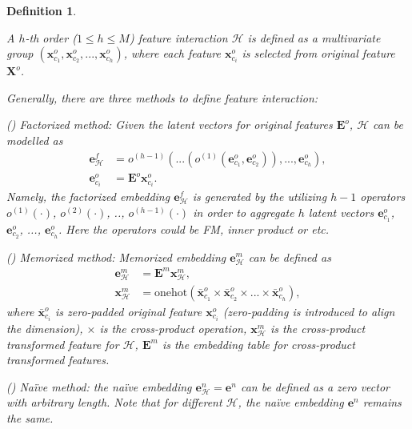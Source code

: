 \documentclass[conference]{IEEEtran}
\newtheorem{myDef}{Definition}
\begin{document}
\begin{myDef}
\label{featuredef}

A $h$-th order ($1 \le h \le M$) feature interaction $\mathcal{H}$ is defined as a multivariate group $(\mathbf{x}^{o}_{c_1}, \mathbf{x}^{o}_{c_2}, ..., \mathbf{x}^{o}_{c_h})$, where each feature $\mathbf{x}^{o}_{c_i}$ is selected from original feature $\mathbf{X}^{o}$. 

Generally, there are three methods to define feature interaction: 

() \emph{Factorized} method: Given the latent vectors for original features $\mathbf{E}^{o}$, $\mathcal{H}$ can be modelled as\cite{AutoPI}
\begin{equation}
\begin{split}
    \mathbf{e}^{f}_{\mathcal{H}} &= o^{(h-1)}(... ( o^{(1)}(\mathbf{e}^{o}_{c_1}, \mathbf{e}^{o}_{c_2})), ... , \mathbf{e}^{o}_{c_h}), \\
    \mathbf{e}^{o}_{c_i} &= \mathbf{E}^{o} \mathbf{x}^{o}_{c_i}.
\end{split}
\end{equation}
Namely, the factorized embedding $\mathbf{e}^{f}_{\mathcal{H}}$ is generated by the utilizing $h-1$ operators $o^{(1)}(\cdot)$, $o^{(2)}(\cdot)$, .., $o^{(h-1)}(\cdot)$ in order to aggregate $h$ latent vectors $\mathbf{e}^{o}_{c_1}$, $\mathbf{e}^{o}_{c_2}$, ..., $\mathbf{e}^{o}_{c_h}$. Here the operators could be FM, inner product or etc.


() \emph{Memorized} method: Memorized embedding $\mathbf{e}^{m}_{\mathcal{H}}$ can be defined as\cite{FIVES} 
\begin{equation}
\begin{split}
\label{memorized}
    \mathbf{e}^{m}_{\mathcal{H}} &= \mathbf{E}^{m} \mathbf{x}^{m}_{\mathcal{H}}, \\
    \mathbf{x}^{m}_{\mathcal{H}} &= \text{onehot}(\mathbf{\bar{x}}^{o}_{c_1} \times \mathbf{\bar{x}}^{o}_{c_2}\times ... \times \mathbf{\bar{x}}^{o}_{c_h}),
\end{split}
\end{equation}
where $\mathbf{\bar{x}}^{o}_{c_i}$ is zero-padded original feature $\mathbf{x}^{o}_{c_i}$ (zero-padding is introduced to align the dimension), $\times$ is the cross-product operation, $\mathbf{x}^{m}_{\mathcal{H}}$ is the cross-product transformed feature for $\mathcal{H}$, $\mathbf{E}^{m}$ is the embedding table for cross-product transformed features.

() \emph{Naïve} method: the naïve embedding $\mathbf{e}^n_{\mathcal{H}} = \mathbf{e}^n$ can be defined as a zero vector with arbitrary length. Note that for different $\mathcal{H}$, the naïve embedding $\mathbf{e}^n$ remains the same.

\end{myDef}
\end{document}
